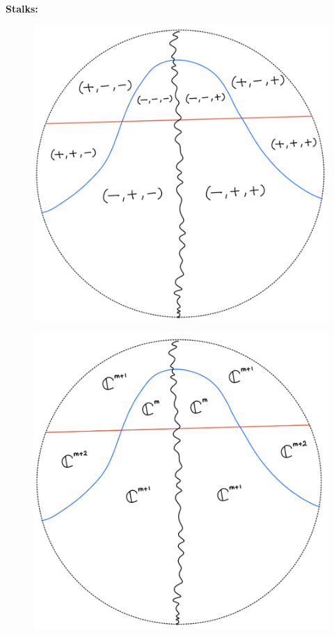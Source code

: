 \textbf{Stalks:}
\begin{figure}[H]
    \centering
    \includegraphics[scale = 0.45]{diagrams/lemma3/22.png} 
    \caption{}
    \label{fig:your-label}
\end{figure}
\begin{figure}[H]
    \centering
    \includegraphics[scale = 0.45]{diagrams/lemma3/23.png} 
    \caption{}
    \label{fig:your-label}
\end{figure}
